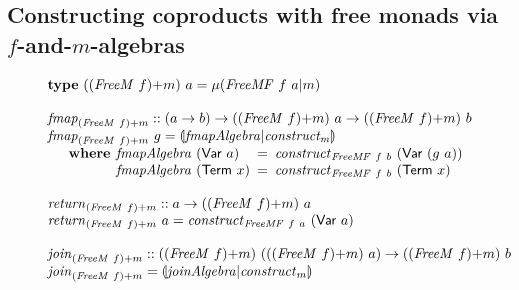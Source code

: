 \documentclass{jfp1}
\newcommand{\eFold}[2]{\llparenthesis #1|#2 \rrparenthesis}
\newcommand{\kw}[1]{\textbf{#1}}
\begin{document}
\subsection{Constructing coproducts with free monads via \texorpdfstring{$f$}{f}-and-\texorpdfstring{$m$}{m}-algebras}
\label{sec:construct-coproducts}

\begin{figure}
  \centering
  \begin{displaymath}
    \begin{array}{@{}l}
      \kw{type}~(\cprd{(\mathit{FreeM}~f)}{m})~a = \mu(\mathit{FreeMF}~f~a|m) \\
      \\
      \begin{array}{@{}l}
        \mathit{fmap}_{\cprd{(\mathit{FreeM}~f)}{m}} :: (a \to b) \to (\cprd{(\mathit{FreeM}~f)}{m})~a \to (\cprd{(\mathit{FreeM}~f)}{m})~b \\
        \mathit{fmap}_{\cprd{(\mathit{FreeM}~f)}{m}}~g = \eFold{\mathit{fmapAlgebra}}{\mathit{construct_m}} \\
        \quad\begin{array}{r@{\hspace{0.4em}}l@{\hspace{0.5em}}c@{\hspace{0.5em}}l}
          \kw{where} & \mathit{fmapAlgebra}~(\mathsf{Var}~a) &=& \mathit{construct}_{\mathit{FreeMF}~f~b}~(\mathsf{Var}~(g~a)) \\
          & \mathit{fmapAlgebra}~(\mathsf{Term}~x) &=& \mathit{construct}_{\mathit{FreeMF}~f~b}~(\mathsf{Term}~x)
        \end{array}
      \end{array} \\
      \\
      \begin{array}{@{}l}
        \mathit{return}_{\cprd{(\mathit{FreeM}~f)}{m}} :: a \to (\cprd{(\mathit{FreeM}~f)}{m})~a \\
        \mathit{return}_{\cprd{(\mathit{FreeM}~f)}{m}}~a = \mathit{construct}_{\mathit{FreeMF}~f~a}~(\mathsf{Var}~a)
      \end{array} \\
      \\
      \begin{array}{@{}l}
        \mathit{join}_{\cprd{(\mathit{FreeM}~f)}{m}} :: (\cprd{(\mathit{FreeM}~f)}{m})~((\cprd{(\mathit{FreeM}~f)}{m})~a) \to (\cprd{(\mathit{FreeM}~f)}{m})~b \\
        \mathit{join}_{\cprd{(\mathit{FreeM}~f)}{m}} = \eFold{\mathit{joinAlgebra}}{\mathit{construct}_m} \\

\end{array}
\end{array}
\end{displaymath}
\end{figure}
\end{document}
